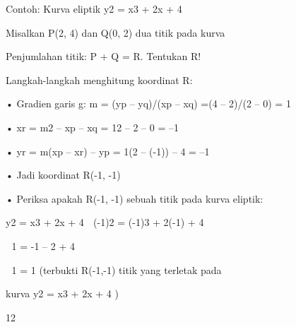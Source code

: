 \documentclass{article}
\begin{document}

Contoh: Kurva eliptik y2 = x3 + 2x + 4 

   Misalkan P(2, 4) dan Q(0, 2) dua titik pada kurva

   Penjumlahan titik: P + Q = R. Tentukan R!

   Langkah-langkah menghitung koordinat R:

• Gradien garis g: m = (yp – yq)/(xp – xq) =(4 – 2)/(2 – 0) = 1

• xr = m2 – xp – xq  = 12 – 2  – 0 = –1   

• yr = m(xp – xr) – yp = 1(2 – (-1)) – 4 = –1

• Jadi koordinat R(-1, -1) 

• Periksa apakah R(-1, -1) sebuah titik pada kurva eliptik:

     y2 = x3 + 2x + 4    (-1)2 = (-1)3 + 2(-1) + 4



    1 = -1 – 2 + 4 



    1 = 1   (terbukti R(-1,-1) titik yang terletak pada 




         kurva y2 = x3 + 2x + 4 ) 


12
\end{document}
